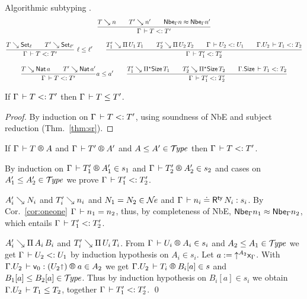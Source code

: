 
Algorithmic subtyping .
\begin{gather*}
  \ru{T \evalsto n \qquad
      T' \evalsto n' \qquad
      \Nbe \Gamma n \nfeq \Nbe \Gamma n'
    }{\Gamma \der T \asub T'}
\\[2ex]
  \rux{T \evalsto \Set[\ell] \qquad
      T' \evalsto \Set[\ell']
    }{\Gamma \der T \asub T'
    }{\ell \leq \ell'}
\qquad
  \ru{T_1' \evalsto \piT{U_1}{T_1} \qquad
      T_2' \evalsto \piT{U_2}{T_2} \qquad
      \Gamma \der U_2 \asub U_1 \qquad
      \cext \Gamma {U_2} \der T_1 \asub T_2
    }{\Gamma \der T_1' \asub T_2'}
\\[2ex]
  \ru{T \evalsto \Nat a \qquad
      T' \evalsto \Nat a'
    }{\Gamma \der T \asub T'
    }{a \leq a'}
\qquad
  \ru{T_1' \evalsto \epiT\Size{T_1} \qquad
      T_2' \evalsto \epiT\Size{T_2} \qquad
      \cext \Gamma {\Size} \der T_1 \asub T_2
    }{\Gamma \der T_1' \asub T_2'}
\end{gather*}

\begin{lemma}
  \label{lem:asubsound}
  If\/ $\Gamma \,\vdash T \mathrel{{<}{:}} T'$ then $\Gamma \,\vdash T \leq T'$.
\end{lemma}
\begin{proof}
  By induction on $\Gamma \,\vdash T \mathrel{{<}{:}} T'$, using soundness of NbE and subject reduction (Thm.~\ref{thm:sr}).
\end{proof}

\begin{lemma}
\label{lem:lrasub}
\bla
   If\/ $\RG \Gamma T A$ and $\RG \Gamma {T'} {A'}$ and $A \leq A' \in \mathcal{T}\!\mathit{ype}$ then $\Gamma \,\vdash T \mathrel{{<}{:}} T'$.
\end{lemma}
\begin{proof*}
By induction on %
$\LRTS \Gamma {T_1'} {A_1'} {s_1}$ and $\LRTS \Gamma {T_2'} {A_2'} {s_2}$
and cases on $A_1' \leq A_2' \in \mathcal{T}\!\mathit{ype}$
we prove $\Gamma \,\vdash T_1' \mathrel{{<}{:}} T_2'$.

\begin{caselist}

\nextcase $A_i' \searrow N_i$ and $T_i' \searrow n_i$ and $N_1 = N_2 \in \mathcal{N}\!\mathit{e}$ and $\Gamma \,\vdash n_i \doteq \mathsf{R}^{\mathsf{ty}}\, N_i : s_i$.
By Cor.~\ref{cor:oneone} $\Gamma \,\vdash n_1 = n_2$, thus, by completeness of NbE, $\mathsf{Nbe}_{\Gamma} n_1 \approx \mathsf{Nbe}_{\Gamma} n_2$, which entails $\Gamma \,\vdash T_1' \mathrel{{<}{:}} T_2'$.

\nextcase $A_i' \searrow \Pi\,A_i\, {B_i}$ and  $T_i' \searrow \Pi\,U_i\,{T_i}$.
From $\LRTS \Gamma {U_i} {A_i} {s_i}$ and $A_2 \leq A_1 \in \mathcal{T}\!\mathit{ype}$ we get $\Gamma \,\vdash U_2 \mathrel{{<}{:}} U_1$
by induction hypothesis on $A_i \in s_i$.
Let $a := {\mathord{\uparrow^{A_2}} \mathsf{x}_{\Gamma}}$.  With $\LR {\cext \Gamma {U_2}} {\ind 0} {(U_2\slift)} a {A_2}$ we get
$\LRTS {\cext \Gamma {U_2}} {T_i} {B_i[a]} s$ and $B_1[a] \leq B_2[a] \in \mathcal{T}\!\mathit{ype}$.  Thus by induction hypothesis on $B_i[a] \in s_i$ we obtain $\Gamma. {U_2} \,\vdash T_1 \leq T_2$, together $\Gamma \,\vdash T_1' \mathrel{{<}{:}} T_2'$.
\qed
\end{caselist}
\end{proof*}

